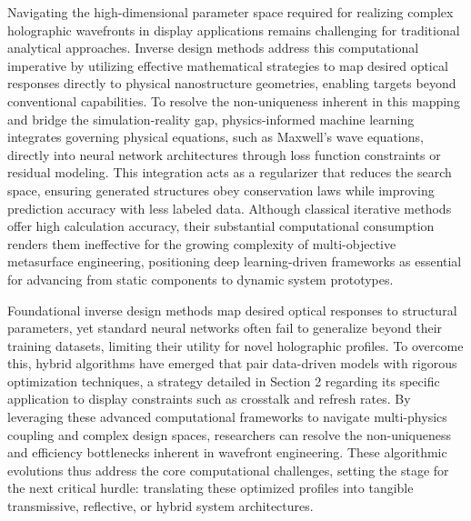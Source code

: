 Navigating the high-dimensional parameter space required for realizing complex holographic wavefronts in display applications remains challenging for traditional analytical approaches. Inverse design methods address this computational imperative by utilizing effective mathematical strategies to map desired optical responses directly to physical nanostructure geometries, enabling targets beyond conventional capabilities. \citep{doi_10_1117_12_3099014_831c7349} \citep{doi_10_1364_ol_567547_28becc59} To resolve the non-uniqueness inherent in this mapping and bridge the simulation-reality gap, physics-informed machine learning integrates governing physical equations, such as Maxwell's wave equations, directly into neural network architectures through loss function constraints or residual modeling. \citep{doi_10_1002_adpr_202300158_66d61883} This integration acts as a regularizer that reduces the search space, ensuring generated structures obey conservation laws while improving prediction accuracy with less labeled data. Although classical iterative methods offer high calculation accuracy, their substantial computational consumption renders them ineffective for the growing complexity of multi-objective metasurface engineering, positioning deep learning-driven frameworks as essential for advancing from static components to dynamic system prototypes. \citep{doi_10_1088_1361_6439_ad3a72_72d60f33} \citep{doi_10_1002_adpr_202300158_66d61883} \citep{doi_10_71465_fapm546_bda368a5}

Foundational inverse design methods map desired optical responses to structural parameters, yet standard neural networks often fail to generalize beyond their training datasets, limiting their utility for novel holographic profiles. To overcome this, hybrid algorithms have emerged that pair data-driven models with rigorous optimization techniques, a strategy detailed in Section 2 regarding its specific application to display constraints such as crosstalk and refresh rates. By leveraging these advanced computational frameworks to navigate multi-physics coupling and complex design spaces, researchers can resolve the non-uniqueness and efficiency bottlenecks inherent in wavefront engineering. \citep{doi_10_1038_s41467_026_76714_x_8ca5d39b} These algorithmic evolutions thus address the core computational challenges, setting the stage for the next critical hurdle: translating these optimized profiles into tangible transmissive, reflective, or hybrid system architectures. \citep{doi_10_1021_acsphotonics_2c00968_06a2e96b} \citep{doi_10_1038_s41467_026_76714_x_8ca5d39b} \citep{doi_10_5757_asct_2023_32_6_141_32febf1c}

